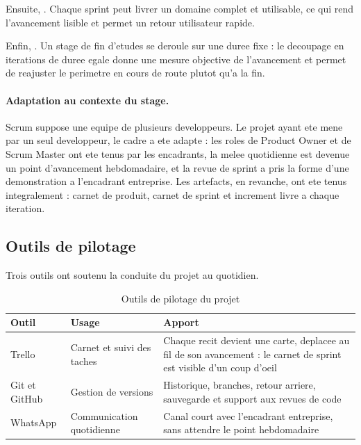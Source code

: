 Ensuite, . Chaque sprint peut livrer un domaine
complet et utilisable, ce qui rend l'avancement lisible et permet un
retour utilisateur rapide.

Enfin, . Un stage de fin
d'etudes se deroule sur une duree fixe : le decoupage en iterations de
duree egale donne une mesure objective de l'avancement et permet de
reajuster le perimetre en cours de route plutot qu'a la fin.

\paragraph{Adaptation au contexte du stage.}
Scrum suppose une equipe de plusieurs developpeurs. Le projet ayant ete
mene par un seul developpeur, le cadre a ete adapte : les roles de
Product Owner et de Scrum Master ont ete tenus par les encadrants, la
melee quotidienne est devenue un point d'avancement hebdomadaire, et la
revue de sprint a pris la forme d'une demonstration a l'encadrant
entreprise. Les artefacts, en revanche, ont ete tenus integralement :
carnet de produit, carnet de sprint et increment livre a chaque
iteration.

\subsection{Outils de pilotage}
\label{sec:outils-pilotage}

Trois outils ont soutenu la conduite du projet au quotidien.

\begin{table}[H]
\centering
\caption{Outils de pilotage du projet}
\label{tab:outils-pilotage}
\small
\begin{tabularx}{\textwidth}{@{}p{2.2cm}p{3.4cm}X@{}}
\toprule
\textbf{Outil} & \textbf{Usage} & \textbf{Apport} \\ \midrule
Trello & Carnet et suivi des taches & Chaque recit devient une carte,
  deplacee au fil de son avancement : le carnet de sprint est visible
  d'un coup d'oeil \\
Git et GitHub & Gestion de versions & Historique, branches, retour
  arriere, sauvegarde et support aux revues de code \\
WhatsApp & Communication quotidienne & Canal court avec l'encadrant
  entreprise, sans attendre le point hebdomadaire \\
\bottomrule
\end{tabularx}
\end{table}

